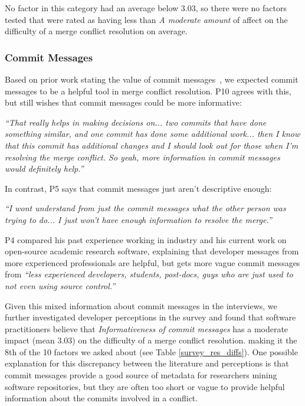 No factor in this category had an average below 3.03, so there were no factors tested that were rated as having less than \textit{A moderate amount} of affect on the difficulty of a merge conflict resolution on average.

\subsubsection{Commit Messages}
Based on prior work stating the value of commit messages~\cite{yamauchi2014clustering}\cite{hindle2009automatic}\cite{cortes2014automatically}\cite{hattori2008nature}, we expected commit messages to be a helpful tool in merge conflict resolution. 
P10 agrees with this, but still wishes that commit messages could be more informative:
\begin{displayquote}
	\textit{``That really helps in making decisions on... two commits that have done something similar, and one commit has done some additional work... then I know that this commit has additional changes and I should look out for those when I'm resolving the merge conflict. So yeah, more information in commit messages would definitely help.''}
\end{displayquote}

In contrast, P5 says that commit messages just aren't descriptive enough:
\begin{displayquote}
\textit{``I wont understand from just the commit messages what the other person was trying to do... I just won't have enough information to resolve the merge.''}
\end{displayquote}

P4 compared his past experience working in industry and his current work on open-source academic research software, explaining that developer messages from more experienced professionals are helpful, but gets more vague commit messages from \textit{``less experienced developers, students, post-docs, guys who are just used to not even using source control.''}

Given this mixed information about commit messages in the interviews, we further investigated developer perceptions in the survey and found that software practitioners believe that \textit{Informativeness of commit messages} has a moderate impact (mean 3.03) on the difficulty of a merge conflict resolution. making it the 8th  of the 10 factors we asked about (see Table \ref{survey_res_diffs}). One possible explanation for this discrepancy between the literature and perceptions is that commit messages provide a good source of metadata for researchers mining software repositories, but they are often too short or vague to provide helpful information about the commits involved in a conflict.
